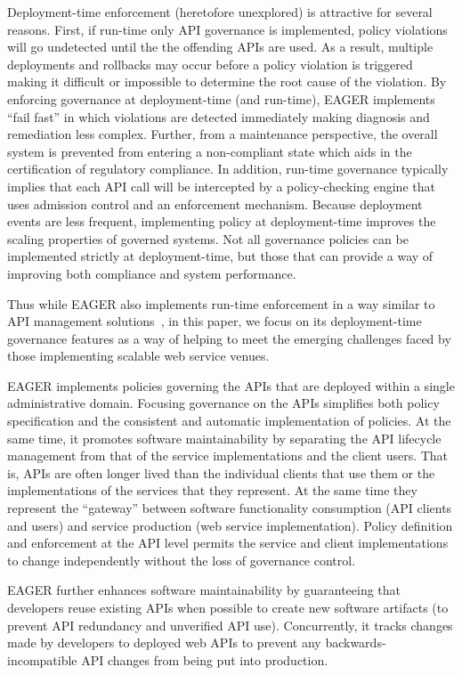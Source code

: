 Deployment-time enforcement (heretofore unexplored) is attractive for several
reasons.  First, if run-time only API governance is implemented, 
policy violations will go undetected until the the offending APIs are used.  
As a result, multiple deployments and rollbacks may occur before a policy
violation is triggered making it difficult or impossible to determine the root
cause of the violation.  By enforcing governance at deployment-time (and
run-time),
EAGER implements ``fail fast'' in which violations are detected
immediately making diagnosis and remediation less complex.  
Further, from a maintenance perspective,  the overall
system is prevented from entering a non-compliant state which aids in the
certification of regulatory compliance.  In addition, run-time governance
typically implies that each API call will be intercepted by a policy-checking engine
that uses admission control and an enforcement mechanism.  Because deployment
events are less frequent, implementing policy at deployment-time improves the
scaling properties of governed systems.   Not all governance policies can be
implemented strictly at deployment-time, but those that can provide a way
of improving both compliance and system performance.

Thus while
EAGER also implements run-time
enforcement in a way similar to API management
solutions~\cite{wso2am,apigee,layer7,3scale}, in this paper, we focus
on its deployment-time governance features as a way of helping to meet the
emerging challenges faced by those
implementing scalable web service venues. 

EAGER implements policies governing the APIs that are 
deployed within a single administrative domain.  Focusing governance on
the APIs simplifies both policy specification and the consistent
and automatic implementation of policies.  At the same time, it promotes
software maintainability by separating the API lifecycle management from that
of the service implementations and the client users.  That is, APIs are often
longer lived than the individual clients that use them or the implementations
of the services that they represent.  At the same time they represent the
``gateway'' between software functionality consumption 
(API clients and users) and service
production (web service implementation).  Policy definition and enforcement at
the API level permits the service and client implementations to change
independently without the loss of governance control.

EAGER further enhances software maintainability by guaranteeing that 
developers reuse existing APIs when possible to create new software artifacts
(to prevent API redundancy and unverified API use). Concurrently, it
tracks changes made by developers to deployed web APIs to prevent
any backwards-incompatible API changes from being put into production.

